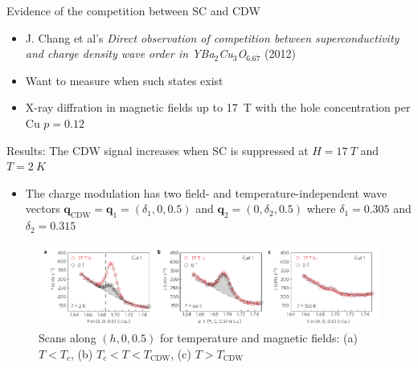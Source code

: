 \documentclass{beamer}
\newcommand*\vf[1]{\mathbf{#1}}
\begin{document}
\begin{frame}{Evidence of the competition between SC and CDW}
\begin{itemize}
\item J. Chang et al's \textit{Direct observation of competition between superconductivity and charge density wave order in YBa$_2$Cu$_3$O$_{6.67}$} (2012)
\item Want to measure when such states exist
\item X-ray diffration in magnetic fields up to 17~T with the hole concentration per Cu $p = 0.12$
\end{itemize}
\end{frame}

\begin{frame}{Results: The CDW signal increases when SC is suppressed at $H = 17~T$ and $T = 2~K$}
\begin{itemize}
\item The charge modulation has two field- and temperature-independent wave vectors $\vf{q}_{\text{CDW}} = \vf{q}_1 = (\delta_1, 0, 0.5)$ and $\vf{q}_2 = (0, \delta_2, 0.5)$ where $\delta_1 = 0.305$ and $\delta_2 = 0.315$
\end{itemize}
\begin{figure}
\includegraphics[width=\textwidth]{figs/chang_1.pdf}
\caption{\label{fig:chang_1} Scans along $(h, 0, 0.5)$ for temperature and magnetic fields: (a) $T < T_c$, (b) $T_c < T < T_{\text{CDW}}$, (c) $T > T_{\text{CDW}}$}
\end{figure}
\end{frame}
\end{document}
